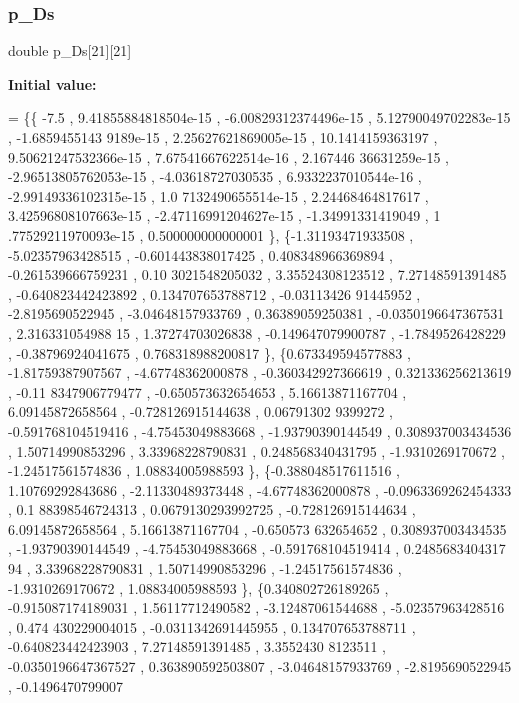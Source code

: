 \subsubsection{\texorpdfstring{p\+\_\+\+Ds}{p\_Ds}}
{\footnotesize\ttfamily double p\+\_\+\+Ds\mbox{[}21\mbox{]}\mbox{[}21\mbox{]}}

{\bfseries Initial value\+:}
\begin{DoxyCode}
= \{\{             -7.5 , 9.41855884818504e-15 , -6.00829312374496e-15 , 5.12790049702283e-15 , -1.6859455143
      9189e-15 , 2.25627621869005e-15 ,  10.1414159363197 , 9.50621247532366e-15 , 7.67541667622514e-16 , 2.167446
      36631259e-15 , -2.96513805762053e-15 , -4.03618727030535 , 6.9332237010544e-16 , -2.99149336102315e-15 , 1.0
      7132490655514e-15 ,  2.24468464817617 , 3.42596808107663e-15 , -2.47116991204627e-15 , -1.34991331419049 , 1
      .77529211970093e-15 , 0.500000000000001 \},
\{-1.31193471933508 , -5.02357963428515 , -0.601443838017425 , 0.408348966369894 , -0.261539666759231 , 0.10
      3021548205032 ,  3.35524308123512 ,  7.27148591391485 , -0.640823442423892 , 0.134707653788712 , -0.03113426
      91445952 ,  -2.8195690522945 , -3.04648157933769 ,  0.36389059250381 , -0.0350196647367531 ,  2.316331054988
      15 ,  1.37274703026838 , -0.149647079900787 ,  -1.7849526428229 , -0.38796924041675 , 0.768318988200817 \},
\{0.673349594577883 , -1.81759387907567 , -4.67748362000878 , -0.360342927366619 , 0.321336256213619 , -0.11
      8347906779477 , -0.650573632654653 ,  5.16613871167704 ,  6.09145872658564 , -0.728126915144638 , 0.06791302
      9399272 , -0.591768104519416 , -4.75453049883668 , -1.93790390144549 , 0.308937003434536 ,  1.50714990853296
       ,  3.33968228790831 , 0.248568340431795 ,  -1.9310269170672 , -1.24517561574836 ,  1.08834005988593 \},
\{-0.388048517611516 ,  1.10769292843686 , -2.11330489373448 , -4.67748362000878 , -0.0963369262454333 , 0.1
      88398546724313 , 0.0679130293992725 , -0.728126915144634 ,  6.09145872658564 ,  5.16613871167704 , -0.650573
      632654652 , 0.308937003434535 , -1.93790390144549 , -4.75453049883668 , -0.591768104519414 , 0.2485683404317
      94 ,  3.33968228790831 ,  1.50714990853296 , -1.24517561574836 ,  -1.9310269170672 ,  1.08834005988593 \},
\{0.340802726189265 , -0.915087174189031 ,  1.56117712490582 , -3.12487061544688 , -5.02357963428516 , 0.474
      430229004015 , -0.0311342691445955 , 0.134707653788711 , -0.640823442423903 ,  7.27148591391485 ,  3.3552430
      8123511 , -0.0350196647367527 , 0.363890592503807 , -3.04648157933769 ,  -2.8195690522945 , -0.1496470799007

\end{DoxyCode}
